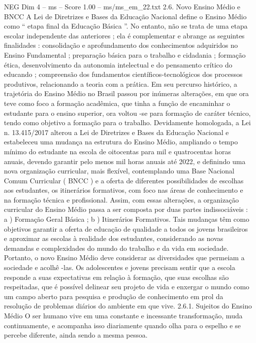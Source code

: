 \begin{textsample}{NEG Dim 4 – ms – Score 1.00 – ms/ms\_em\_22.txt}  \label{ex:f4_neg_140}
2.6.
Novo Ensino Médio e BNCC A Lei de Diretrizes e Bases da Educação Nacional define o Ensino Médio como “ etapa final da Educação Básica ”.
No entanto, não se trata de uma etapa escolar independente das anteriores ; ela é complementar e abrange as seguintes finalidades : consolidação e aprofundamento dos conhecimentos adquiridos no Ensino Fundamental ; preparação básica para o trabalho e cidadania ; formação ética, desenvolvimento da autonomia intelectual e do pensamento crítico do educando ; compreensão dos fundamentos científicos-tecnológicos dos processos produtivos, relacionando a teoria com a prática.
Em seu percurso histórico, a trajetória do Ensino Médio no Brasil passou por inúmeras alterações, em que ora teve como foco a formação acadêmica, que tinha a função de encaminhar o estudante para o ensino superior, ora voltou -se para formação de caráter técnico, tendo como objetivo a formação para o trabalho.
Devidamente homologada, a Lei n. 13.415/2017 alterou a Lei de Diretrizes e Bases da Educação Nacional e estabeleceu uma mudança na estrutura do Ensino Médio, ampliando o tempo mínimo do estudante na escola de oitocentas para mil e quatrocentas horas anuais, devendo garantir pelo menos mil horas anuais até 2022, e definindo uma nova organização curricular, mais flexível, contemplando uma Base Nacional Comum Curricular ( BNCC ) e a oferta de diferentes possibilidades de escolhas aos estudantes, os itinerários formativos, com foco nas áreas de conhecimento e na formação técnica e profissional.
Assim, com essas alterações, a organização curricular do Ensino Médio passa a ser composta por duas partes indissociáveis : a ) Formação Geral Básica ; b ) Itinerários Formativos.
Tais mudanças têm como objetivos garantir a oferta de educação de qualidade a todos os jovens brasileiros e aproximar as escolas à realidade dos estudantes, considerando as novas demandas e complexidades do mundo do trabalho e da vida em sociedade.
Portanto, o novo Ensino Médio deve considerar as diversidades que permeiam a sociedade e acolhê -las.
Os adolescentes e jovens precisam sentir que a escola responde a suas expectativas em relação à formação, que suas escolhas são respeitadas, que é possível delinear seu projeto de vida e enxergar o mundo como um campo aberto para pesquisa e produção de conhecimento em prol da resolução de problemas diários do ambiente em que vive. 2.6.1.
Sujeitos do Ensino Médio O ser humano vive em uma constante e incessante transformação, muda continuamente, e acompanha isso diariamente quando olha para o espelho e se percebe diferente, ainda sendo a mesma pessoa.

\end{textsample}
